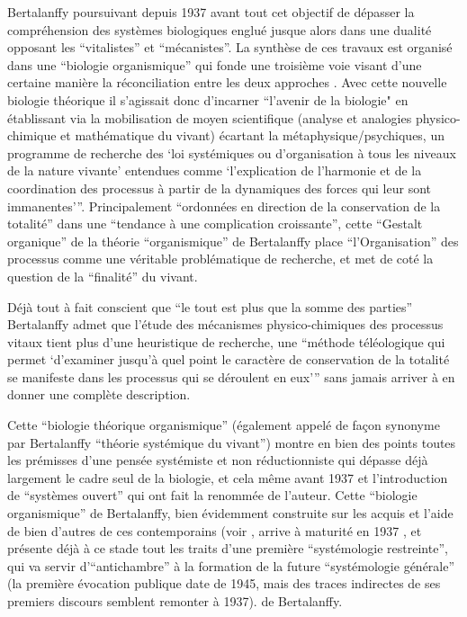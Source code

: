 Bertalanffy poursuivant depuis 1937 avant tout cet objectif de dépasser la compréhension des systèmes biologiques  englué jusque alors dans une dualité opposant les \enquote{vitalistes} et \enquote{mécanistes}. La synthèse de ces travaux est organisé dans une \enquote{biologie organismique} qui fonde une troisième voie visant d'une certaine manière la réconciliation entre les deux approches \autocite[55-56]{Lemoigne1977} \autocite[258]{Bertalanffy1949}. Avec cette nouvelle biologie théorique il s'agissait donc d'incarner \enquote{l'avenir de la biologie" en établissant via la mobilisation de moyen scientifique (analyse et analogies physico-chimique et mathématique du vivant) écartant la métaphysique/psychiques, un programme de recherche des \enquote{loi systémiques ou d'organisation à tous les niveaux de la nature vivante} entendues comme \enquote{l'explication de l'harmonie et de la coordination des processus à partir de la dynamiques des forces qui leur sont immanentes}}\autocite[456]{Pouvreau2013}. Principalement \enquote{ordonnées en direction de la conservation de la totalité}\autocite[440-458]{Pouvreau2013} dans une \enquote{tendance à une complication croissante}, cette \enquote{Gestalt organique} de la théorie \enquote{organismique} de Bertalanffy place \enquote{l'Organisation} des processus comme une véritable problématique de recherche, et met de coté la question de la \enquote{finalité} du vivant.\autocite[455-457]{Pouvreau2013}

Déjà tout à fait conscient que \enquote{le tout est plus que la somme des parties} Bertalanffy admet que l'étude des mécanismes physico-chimiques des processus vitaux tient plus d'une heuristique de recherche, une \enquote{méthode téléologique qui permet \enquote{d'examiner jusqu’à quel point le caractère de conservation de la totalité se manifeste dans les processus qui se déroulent en eux}} sans jamais arriver à en donner une complète description.\autocite[464]{Pouvreau2013}

Cette \enquote{biologie théorique organismique} (également appelé de façon synonyme par Bertalanffy \enquote{théorie systémique du vivant}) montre en bien des points toutes les prémisses d'une pensée systémiste et non réductionniste qui dépasse déjà largement le cadre seul de la biologie, et cela même avant 1937 et l'introduction de \enquote{systèmes ouvert} \autocite[499]{Pouvreau2013} qui ont fait la renommée de l'auteur.  Cette \enquote{biologie organismique} de Bertalanffy, bien évidemment construite sur les acquis et l'aide de bien d'autres de ces contemporains (voir \autocite{Pouvreau2013}, arrive à maturité en 1937 \autocite[14]{Pouvreau2013}, et présente déjà à ce stade tout les traits d'une première \enquote{systémologie restreinte}, qui va servir d'\enquote{antichambre} à la formation de la future \enquote{systémologie générale} (la première évocation publique date de 1945, mais des traces indirectes de ses premiers discours semblent remonter à 1937).\autocite[670]{Pouvreau2013} de Bertalanffy.

